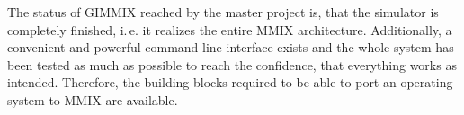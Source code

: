 \documentclass[a4paper,11pt]{article}
\newcommand{\ie}{i.\,e. }
\begin{document}
\medskip

The status of GIMMIX reached by the master project is, that the simulator is completely finished, \ie it realizes the entire MMIX architecture. Additionally, a convenient and powerful command line interface exists and the whole system has been tested as much as possible to reach the confidence, that everything works as intended. Therefore, the building blocks required to be able to port an operating system to MMIX are available.
\end{document}
